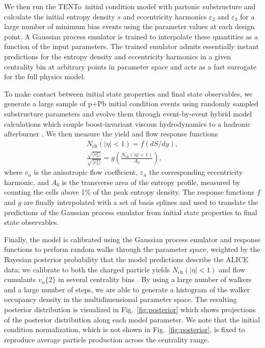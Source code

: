 \documentclass[3p,times,procedia]{elsarticle}
\newcommand{\trento}{T\raisebox{-0.3ex}{R}ENTo}
\newcommand{\e}{\varepsilon}
\newcommand{\vn}{\sqrt{\langle v_n^2 \rangle}}
\newcommand{\en}{\sqrt{\langle \varepsilon_n^2 \rangle}}
\begin{document}
We then run the \trento\ initial condition model with partonic substructure and calculate the initial entropy density $s$ and eccentricity harmonics $\e_2$ and $\e_3$ for a large number of minimum bias events using the parameter values at each design point.
A Gaussian process emulator is trained to interpolate these quantities as a function of the input parameters.
The trained emulator admits essentially instant predictions for the entropy density  and eccentricity harmonics in a given centrality bin at arbitrary points in parameter space and acts as a fast surrogate for the full physics model.

To make contact between initial state properties and final state observables, we generate a large sample of p+Pb initial condition events using randomly sampled substructure parameters and evolve them through event-by-event hybrid model calculations which couple boost-invariant viscous hydrodynamics to a hadronic afterburner \cite{Shen:2014vra}.
We then measure the yield and flow response functions 
\begin{align}
  \label{response}
  N_\mathrm{ch}(|\eta| < 1) = f(dS/dy), \\
  \frac{\vn}{\en} = g\left(\frac{N_\mathrm{ch}(|\eta| < 1)}{A_0}\right),
\end{align}
where $v_n$ is the anisotropic flow coefficient, $\varepsilon_n$ the corresponding eccentricity harmonic, and $A_0$ is the transverse area of the entropy profile, measured by counting the cells above 1\% of the peak entropy density. 
The response functions $f$ and $g$ are finally interpolated with a set of basis splines and used to translate the predictions of the Gaussian process emulator from initial state properties to final state observables. 

Finally, the model is calibrated using the Gaussian process emulator and response functions to perform random walks through the parameter space, weighted by the Bayesian posterior probability that the model predictions describe the ALICE data; we calibrate to both the charged particle yields $N_\mathrm{ch}(|\eta| < 1)$ and flow cumulants $v_n\{2\}$ in several centrality bins \cite{Abelev:2014mda}.
By using a large number of walkers and a large number of steps, we are able to generate a histogram of the walker occupancy density in the multidimensional parameter space.
The resulting posterior distribution is visualized in Fig.~\ref{fig:posterior} which shows projections of the posterior distribution along each model parameter.
We note that the initial condition normalization, which is not shown in Fig.~\ref{fig:posterior}, is fixed to reproduce average particle production across the centrality range.
\end{document}
